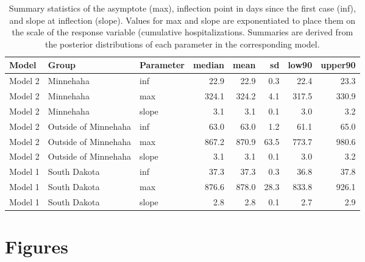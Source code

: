 \documentclass[
]{article}
\begin{document}
\begin{table}[!h]

\caption{\label{tab:unnamed-chunk-2}Summary statistics of the asymptote (max), inflection point in days since the first case (inf), and slope at inflection (slope). Values for max and slope are exponentiated to place them on the scale of the response variable (cumulative hospitalizations. Summaries are derived from the posterior distributions of each parameter in the corresponding model.}
\centering
\begin{tabular}[t]{lllrrrrr}
\toprule
Model & Group & Parameter & median & mean & sd & low90 & upper90\\
\midrule
\rowcolor{gray!6}  Model 2 & Minnehaha & inf & 22.9 & 22.9 & 0.3 & 22.4 & 23.3\\
Model 2 & Minnehaha & max & 324.1 & 324.2 & 4.1 & 317.5 & 330.9\\
\rowcolor{gray!6}  Model 2 & Minnehaha & slope & 3.1 & 3.1 & 0.1 & 3.0 & 3.2\\
Model 2 & Outside of Minnehaha & inf & 63.0 & 63.0 & 1.2 & 61.1 & 65.0\\
\rowcolor{gray!6}  Model 2 & Outside of Minnehaha & max & 867.2 & 870.9 & 63.5 & 773.7 & 980.6\\
\addlinespace
Model 2 & Outside of Minnehaha & slope & 3.1 & 3.1 & 0.1 & 3.0 & 3.2\\
\rowcolor{gray!6}  Model 1 & South Dakota & inf & 37.3 & 37.3 & 0.3 & 36.8 & 37.8\\
Model 1 & South Dakota & max & 876.6 & 878.0 & 28.3 & 833.8 & 926.1\\
\rowcolor{gray!6}  Model 1 & South Dakota & slope & 2.8 & 2.8 & 0.1 & 2.7 & 2.9\\
\bottomrule
\end{tabular}
\end{table}

\newpage

\FloatBarrier

\hypertarget{figures}{%
\section{Figures}\label{figures}}
\end{document}
